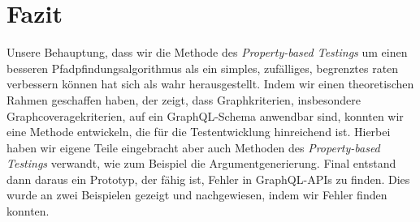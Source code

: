 \chapter{Fazit}

Unsere Behauptung, dass wir die Methode des \textit{Property-based Testings} um einen besseren Pfadpfindungsalgorithmus
als ein simples, zufälliges, begrenztes raten verbessern können hat sich als wahr herausgestellt.
Indem wir einen theoretischen Rahmen geschaffen haben, der zeigt, dass Graphkriterien, insbesondere Graphcoveragekriterien,
auf ein GraphQL-Schema anwendbar sind, konnten wir eine Methode entwickeln, die für die Testentwicklung hinreichend ist.
Hierbei haben wir eigene Teile eingebracht aber auch Methoden des \textit{Property-based Testings} verwandt, wie zum Beispiel die Argumentgenerierung.
Final entstand dann daraus ein Prototyp, der fähig ist, Fehler in GraphQL-APIs zu finden.
Dies wurde an zwei Beispielen gezeigt und nachgewiesen, indem wir Fehler finden konnten.
